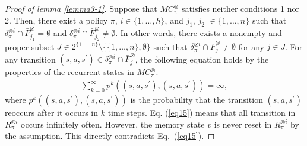 \begin{proof}[Proof of lemma \ref{lemma3-1}]
Suppose that $MC^{\otimes}_{\pi}$ satisfies neither conditions 1 nor 2. Then, there exist a policy $\pi$, $i \in \{ 1, \ldots ,h \}$, and $j_1$, $j_2$ $\in \{ 1, \ldots ,n \}$ such that $\delta^{\otimes i}_{\pi} \cap \bar{F}^{\otimes}_{j_1} = \emptyset$ and $\delta^{\otimes i}_{\pi} \cap \bar{F}^{\otimes}_{j_2} \neq \emptyset$. In other words, there exists a nonempty and proper subset $J \in 2^{\{ 1, \ldots ,n \}} \setminus \{ \{ 1, \ldots ,n \}, \emptyset \}$ such that $ \delta^{\otimes i}_{\pi} \cap \bar{F}^{\otimes}_j \neq \emptyset $ for any $j \in J$.
 For any transition $ (s,a,s^{\prime}) \in \delta^{\otimes i}_{\pi} \cap \bar{F}^{\otimes}_j$, the following equation holds by the properties of the recurrent states in $MC^{\otimes}_{\pi}$\cite{ESS}.
\begin{align}
  \sum_{k=0}^{\infty} p^k((s,a,s^{\prime}),(s,a,s^{\prime})) = \infty,
  \label{eq15}
\end{align}
where $p^k((s,a,s^{\prime}),(s,a,s^{ \prime}))$ is the probability that the transition $(s,a,s^{\prime})$ reoccurs after it occurs in $k$ time steps. Eq. (\ref{eq15}) means that all transition in $R^{\otimes i}_{\pi}$ occurs infinitely often. However, the memory state $v$ is never reset in $R^{\otimes i}_{\pi}$ by the assumption. This directly contradicts Eq.\ (\ref{eq15}).
\end{proof}
